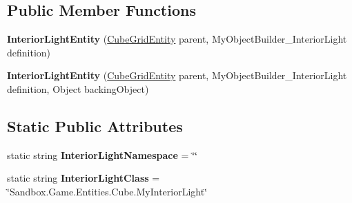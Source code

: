 \subsection*{Public Member Functions}
\begin{DoxyCompactItemize}
\item 
\hypertarget{class_s_e_mod_a_p_i_internal_1_1_a_p_i_1_1_entity_1_1_sector_1_1_sector_object_1_1_cube_grid_1_1a65b5dd2ac66850e8addbe9864d4daa6_a10ca35e9e68b589b8a37403b2ad643d0}{}{\bfseries Interior\+Light\+Entity} (\hyperlink{class_s_e_mod_a_p_i_internal_1_1_a_p_i_1_1_entity_1_1_sector_1_1_sector_object_1_1_cube_grid_entity}{Cube\+Grid\+Entity} parent, My\+Object\+Builder\+\_\+\+Interior\+Light definition)\label{class_s_e_mod_a_p_i_internal_1_1_a_p_i_1_1_entity_1_1_sector_1_1_sector_object_1_1_cube_grid_1_1a65b5dd2ac66850e8addbe9864d4daa6_a10ca35e9e68b589b8a37403b2ad643d0}

\item 
\hypertarget{class_s_e_mod_a_p_i_internal_1_1_a_p_i_1_1_entity_1_1_sector_1_1_sector_object_1_1_cube_grid_1_1a65b5dd2ac66850e8addbe9864d4daa6_abcbb53db10eb2d970a785bec0d1650e6}{}{\bfseries Interior\+Light\+Entity} (\hyperlink{class_s_e_mod_a_p_i_internal_1_1_a_p_i_1_1_entity_1_1_sector_1_1_sector_object_1_1_cube_grid_entity}{Cube\+Grid\+Entity} parent, My\+Object\+Builder\+\_\+\+Interior\+Light definition, Object backing\+Object)\label{class_s_e_mod_a_p_i_internal_1_1_a_p_i_1_1_entity_1_1_sector_1_1_sector_object_1_1_cube_grid_1_1a65b5dd2ac66850e8addbe9864d4daa6_abcbb53db10eb2d970a785bec0d1650e6}

\end{DoxyCompactItemize}
\subsection*{Static Public Attributes}
\begin{DoxyCompactItemize}
\item 
\hypertarget{class_s_e_mod_a_p_i_internal_1_1_a_p_i_1_1_entity_1_1_sector_1_1_sector_object_1_1_cube_grid_1_1a65b5dd2ac66850e8addbe9864d4daa6_a7e7b37368283418c248759fd71532744}{}static string {\bfseries Interior\+Light\+Namespace} = \char`\"{}\char`\"{}\label{class_s_e_mod_a_p_i_internal_1_1_a_p_i_1_1_entity_1_1_sector_1_1_sector_object_1_1_cube_grid_1_1a65b5dd2ac66850e8addbe9864d4daa6_a7e7b37368283418c248759fd71532744}

\item 
\hypertarget{class_s_e_mod_a_p_i_internal_1_1_a_p_i_1_1_entity_1_1_sector_1_1_sector_object_1_1_cube_grid_1_1a65b5dd2ac66850e8addbe9864d4daa6_a6f7e800f9270f2dffaa9d93f6068df7a}{}static string {\bfseries Interior\+Light\+Class} = \char`\"{}Sandbox.\+Game.\+Entities.\+Cube.\+My\+Interior\+Light\char`\"{}\label{class_s_e_mod_a_p_i_internal_1_1_a_p_i_1_1_entity_1_1_sector_1_1_sector_object_1_1_cube_grid_1_1a65b5dd2ac66850e8addbe9864d4daa6_a6f7e800f9270f2dffaa9d93f6068df7a}

\end{DoxyCompactItemize}
